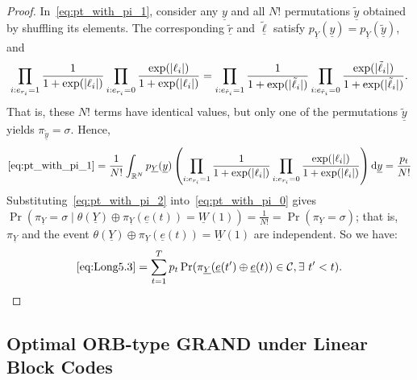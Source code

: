 \documentclass[letterpaper,draftclsnofoot,onecolumn]{IEEEtran}
\begin{document}
\begin{proof}
    In~\eqref{eq:pt_with_pi_1}, consider any $\underline{y}$ and all $N!$ permutations $\tilde{\underline{y}}$ obtained by shuffling its elements. The corresponding $\tilde{\underline{r}}$ and $\tilde{\underline{\ell}}$ satisfy $p_{\underline{Y}}(\underline{y}) = p_{\underline{Y}}(\tilde{\underline{y}})$, and
    \begin{equation}
        \prod_{i:e_{r_i} = 1 } \frac{1}{1+\exp(|\ell_i|)} \prod_{i:e_{r_i} = 0} \frac{\exp(|\ell_i|)} {1+\exp(|\ell_i|)} = \prod_{i:e_{\Tilde{r}_i} = 1 } \frac{1}{1+\exp(|\Tilde{\ell}_i|)} \prod_{i:e_{\Tilde{r}_i} = 0} \frac{\exp(|\Tilde{\ell}_i|)} {1+\exp(|\Tilde{\ell}_i|)}.
    \end{equation}
    That is, these $N!$ terms have identical values, but only one of the permutations $\tilde{\underline{y}}$ yields $\pi_{\tilde{\underline{y}}} = \sigma$. Hence,
    \begin{equation}\label{eq:pt_with_pi_2}
        \eqref{eq:pt_with_pi_1} = \frac{1}{N!}\int_{\mathbb{R}^N}p_{\underline{Y}}(\underline{y})\left(\prod_{i:e_{r_i} = 1 } \frac{1}{1+\exp(|\ell_i|)} \prod_{i:e_{r_i} = 0} \frac{\exp(|\ell_i|)} {1+\exp(|\ell_i|)}\right)\mathrm{d}\underline{y} = \frac{p_t}{N!}
    \end{equation}
    Substituting~\eqref{eq:pt_with_pi_2} into~\eqref{eq:pt_with_pi_0} gives $\Pr(\pi_{\underline{Y}} = \sigma \mid \theta(\underline{Y})\oplus \pi_{\underline{Y}}(\underline{e}(t))=\underline{W}(1)) = \frac{1}{N!}= \Pr(\pi_{\underline{Y}} = \sigma)$; that is, $\pi_{\underline{Y}}$ and the event $\theta(\underline{Y})\oplus \pi_{\underline{Y}}(\underline{e}(t))=\underline{W}(1)$ are independent. So we have:
    \begin{equation}
        \eqref{eq:Long5.3} = \sum_{t=1}^{T}p_{t}\Pr(\pi_{\underline{Y}}(\underline{e}(t') \oplus \underline{e}(t)) \in \mathcal{C},\exists\ t'< t). \label{eq:Long5.4}
    \end{equation}
    
\end{proof}


\subsection{Optimal ORB-type GRAND under Linear Block Codes}\label{SubSec:linear_code_conclusion}
\end{document}
